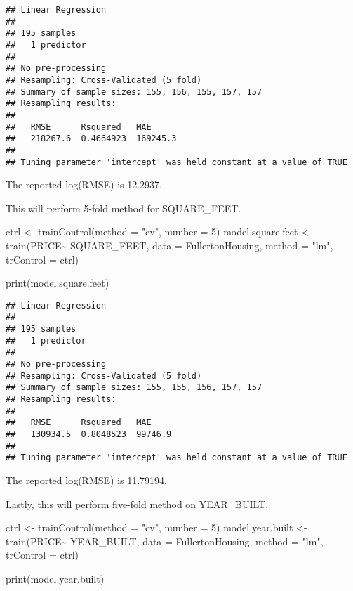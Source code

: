 \documentclass[
]{article}
\newenvironment{Shaded}{\begin{snugshade}}{\end{snugshade}}
\newcommand{\AttributeTok}[1]{\textcolor[rgb]{0.77,0.63,0.00}{#1}}
\newcommand{\DecValTok}[1]{\textcolor[rgb]{0.00,0.00,0.81}{#1}}
\newcommand{\FunctionTok}[1]{\textcolor[rgb]{0.00,0.00,0.00}{#1}}
\newcommand{\NormalTok}[1]{#1}
\newcommand{\OtherTok}[1]{\textcolor[rgb]{0.56,0.35,0.01}{#1}}
\newcommand{\SpecialCharTok}[1]{\textcolor[rgb]{0.00,0.00,0.00}{#1}}
\newcommand{\StringTok}[1]{\textcolor[rgb]{0.31,0.60,0.02}{#1}}
\begin{document}
\begin{verbatim}
## Linear Regression 
## 
## 195 samples
##   1 predictor
## 
## No pre-processing
## Resampling: Cross-Validated (5 fold) 
## Summary of sample sizes: 155, 156, 155, 157, 157 
## Resampling results:
## 
##   RMSE      Rsquared   MAE     
##   218267.6  0.4664923  169245.3
## 
## Tuning parameter 'intercept' was held constant at a value of TRUE
\end{verbatim}

The reported log(RMSE) is 12.2937.

This will perform 5-fold method for SQUARE\_FEET.

\begin{Shaded}
\begin{Highlighting}[]
\NormalTok{ctrl }\OtherTok{\textless{}{-}} \FunctionTok{trainControl}\NormalTok{(}\AttributeTok{method =} \StringTok{"cv"}\NormalTok{, }\AttributeTok{number =} \DecValTok{5}\NormalTok{)}
\NormalTok{model.square.feet }\OtherTok{\textless{}{-}} \FunctionTok{train}\NormalTok{(PRICE}\SpecialCharTok{\textasciitilde{}}\NormalTok{ SQUARE\_FEET, }
               \AttributeTok{data =}\NormalTok{ FullertonHousing, }\AttributeTok{method =} \StringTok{"lm"}\NormalTok{, }\AttributeTok{trControl =}\NormalTok{ ctrl)}

\FunctionTok{print}\NormalTok{(model.square.feet)}
\end{Highlighting}
\end{Shaded}

\begin{verbatim}
## Linear Regression 
## 
## 195 samples
##   1 predictor
## 
## No pre-processing
## Resampling: Cross-Validated (5 fold) 
## Summary of sample sizes: 155, 155, 156, 157, 157 
## Resampling results:
## 
##   RMSE      Rsquared   MAE    
##   130934.5  0.8048523  99746.9
## 
## Tuning parameter 'intercept' was held constant at a value of TRUE
\end{verbatim}

The reported log(RMSE) is 11.79194.

Lastly, this will perform five-fold method on YEAR\_BUILT.

\begin{Shaded}
\begin{Highlighting}[]
\NormalTok{ctrl }\OtherTok{\textless{}{-}} \FunctionTok{trainControl}\NormalTok{(}\AttributeTok{method =} \StringTok{"cv"}\NormalTok{, }\AttributeTok{number =} \DecValTok{5}\NormalTok{)}
\NormalTok{model.year.built }\OtherTok{\textless{}{-}} \FunctionTok{train}\NormalTok{(PRICE}\SpecialCharTok{\textasciitilde{}}\NormalTok{ YEAR\_BUILT, }
               \AttributeTok{data =}\NormalTok{ FullertonHousing, }\AttributeTok{method =} \StringTok{"lm"}\NormalTok{, }\AttributeTok{trControl =}\NormalTok{ ctrl)}

\FunctionTok{print}\NormalTok{(model.year.built)}
\end{Highlighting}
\end{Shaded}
\end{document}
